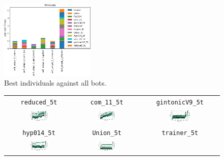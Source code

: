 \documentclass[11pt,a4paper]{scrartcl}
\begin{document}
\begin{figure}[H]
\center
\includegraphics[width=0.4\textwidth]{img/self_adapt_2.png}
\caption{Best individuals against all bots.}
\label{fig:self_adapt_2_aa}
\end{figure}

\begin{figure}[H]
\center
\begin{tabular}{ccc}
\texttt{reduced\_5t} & \texttt{com\_11\_5t} & \texttt{gintonicV9\_5t} \\
\includegraphics[width=0.3\textwidth]{img/self_adapt_2_reduced_5t.png} &
\includegraphics[width=0.3\textwidth]{img/self_adapt_2_com_11_5t.png} &
\includegraphics[width=0.3\textwidth]{img/self_adapt_2_gintonicV9_5t.png} \\
\texttt{hyp014\_5t} & \texttt{Union\_5t} & \texttt{trainer\_5t} \\
\includegraphics[width=0.3\textwidth]{img/self_adapt_2_hyp014_5t.png} &
\includegraphics[width=0.3\textwidth]{img/self_adapt_2_Union_5t.png} &

\end{tabular}
\end{figure}
\end{document}
